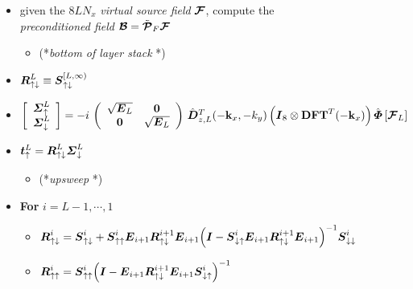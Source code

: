 \begin{figure}
{\begin{minipage} {140.0mm}
\begin{itemize}
\item given the $8 L N_x$ {\em virtual source field\/} ${\CB F}$, compute 
the 
{\em preconditioned field\/} ${\CB B}=\tilde{\CB P}_F {\CB F}$


\begin{itemize}
\item  (*{\em bottom of layer stack\/ }*) 
\end{itemize}
\item ${\bmi R}_{ \uparrow \downarrow }^{L}\equiv 
{\bmi S}_{ \uparrow\downarrow }^{[L,\infty)}$

\item $
\left[{\begin{array}{c}{\bmi \Sigma}^{L}_{\uparrow}\\ 
{\bmi \Sigma}^{L}_{\downarrow}
\end{array}}\right]=-i\,\left({\begin{array}{cc}
\sqrt{{\bmi E}_{L}}&{\bf 0}\\ 
{\bf 0}&\sqrt{{\bmi E}_{L}}
\end{array}}\right)\,\hat{\bmi  D}{}^{T}_{z,L}(-{\bf 
k}_{x},-{k}_{y})\left({\bmi I}_8\otimes
{\bf DFT}^{T}(-{\bf k}_{x})  \right)\hat{\bmi \Phi}\left[{\CB F}_{L}  
\right]
$

\item  	$
{\bmi t}_{ \uparrow }^{L}=
{\bmi R}_{ \uparrow \downarrow }^{L}
{\bmi \Sigma}^{L}_{\downarrow}$

\begin{itemize}
\item  (*{\em upsweep\/ }*) 
\end{itemize}
\item {\bf  For} $i=L-1,\cdots,1$
\begin{itemize}

\item ${\bmi R}_{ \uparrow \downarrow }^{i}=
{\bmi S}_{ \uparrow \downarrow }^{i}+{\bmi S}_{ \uparrow \uparrow 
}^{i}
{\bmi  E}_{i+1} {\bmi R}_{ \uparrow \downarrow }^{i+1} {\bmi  E}_{i+1} 
{\left({{\bmi  I}-{\bmi S}_{ \downarrow 
\uparrow }^{i}
{\bmi  E}_{i+1} {\bmi R}_{ \uparrow \downarrow }^{i+1} {\bmi  E}_{i+1} 
}\right)}^{-1}{\bmi S}_{ \downarrow 
\downarrow }^{i}
 $

\item ${\bmi R}_{ \uparrow \uparrow }^{i}= {\bmi S}_{ \uparrow \uparrow 
}^{i}
{\left({{\bmi  I}-{\bmi  E}_{i+1} {\bmi R}_{ \uparrow \downarrow }^{i+1} 
{\bmi 
E}_{i+1} {\bmi S}_{ \downarrow 
\uparrow }^{i}}\right)}^{-1}$


\end{itemize}
\end{itemize}
\end{minipage}}
\end{figure}
